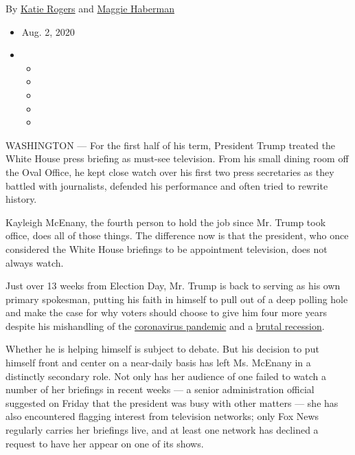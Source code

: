 By \href{https://www.nytimes3xbfgragh.onion/by/katie-rogers}{Katie
Rogers} and
\href{https://www.nytimes3xbfgragh.onion/by/maggie-haberman}{Maggie
Haberman}

\begin{itemize}
\item
  Aug. 2, 2020
\item
  \begin{itemize}
  \item
  \item
  \item
  \item
  \item
  \end{itemize}
\end{itemize}

WASHINGTON --- For the first half of his term, President Trump treated
the White House press briefing as must-see television. From his small
dining room off the Oval Office, he kept close watch over his first two
press secretaries as they battled with journalists, defended his
performance and often tried to rewrite history.

Kayleigh McEnany, the fourth person to hold the job since Mr. Trump took
office, does all of those things. The difference now is that the
president, who once considered the White House briefings to be
appointment television, does not always watch.

Just over 13 weeks from Election Day, Mr. Trump is back to serving as
his own primary spokesman, putting his faith in himself to pull out of a
deep polling hole and make the case for why voters should choose to give
him four more years despite his mishandling of the
\href{https://www.nytimes3xbfgragh.onion/news-event/coronavirus}{coronavirus
pandemic} and a
\href{https://www.nytimes3xbfgragh.onion/2020/07/30/business/economy/q2-gdp-coronavirus-economy.html}{brutal
recession}.

Whether he is helping himself is subject to debate. But his decision to
put himself front and center on a near-daily basis has left Ms. McEnany
in a distinctly secondary role. Not only has her audience of one failed
to watch a number of her briefings in recent weeks --- a senior
administration official suggested on Friday that the president was busy
with other matters --- she has also encountered flagging interest from
television networks; only Fox News regularly carries her briefings live,
and at least one network has declined a request to have her appear on
one of its shows.

